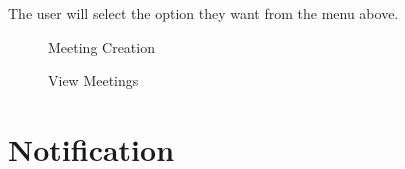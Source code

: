 \documentclass[12pt]{article}
\begin{document}
The user will select the option they want from the menu above.
\begin{figure}[H]
\centering	
{}
\caption{Meeting Creation}
\end{figure}

\begin{figure}[H]
\centering	
{}
\caption{View Meetings}
\end{figure}

\newpage
\section{Notification}
\end{document}
